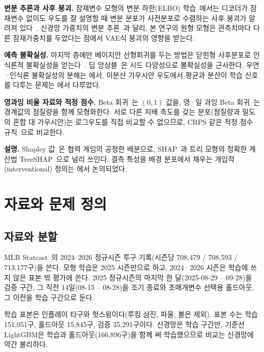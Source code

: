 \documentclass[journal,a4paper,10pt]{IEEEtran}
\begin{document}
\textbf{변분 추론과 사후 붕괴.} 잠재변수 모형의 변분 하한(ELBO) 학습~\cite{kingma2014vae}에서는 디코더가 잠재변수 없이도 우도를 잘 설명할 때 변분 분포가 사전분포로 수렴하는 사후 붕괴가 알려져 있다~\cite{bowman2016generating}. 신경망 가중치의 변분 추론~\cite{blundell2015weight}과 달리, 본 연구의 원형 모형은 관측치마다 다른 잠재가중치를 두었다는 점에서 VAE식 붕괴의 영향을 받는다.

\textbf{예측 불확실성.} 마지막 층에만 베이지안 선형회귀를 두는 방법은 닫힌형 사후분포로 인식론적 불확실성을 얻는다~\cite{snoek2015scalable,bishop2006pattern}. 딥 앙상블~\cite{lakshminarayanan2017simple}은 시드 다양성으로 불확실성을 근사한다. 우연·인식론 불확실성의 분해는 \cite{kendall2017uncertainties}에서, 이분산 가우시안 우도에서 평균과 분산이 학습 신호를 다투는 문제는 \cite{seitzer2022pitfalls}에서 다루었다.

\textbf{영과잉 비율 자료와 적정 점수.} Beta 회귀~\cite{ferrari2004beta}는 $(0,1)$ 값을, 영·일 과잉 Beta 회귀~\cite{ospina2012general}는 경계값의 점질량을 함께 모형화한다. 서로 다른 지배 측도를 갖는 분포(점질량과 밀도의 혼합 대 가우시안)는 로그우도를 직접 비교할 수 없으므로, CRPS 같은 적정 점수 규칙~\cite{gneiting2007strictly}으로 비교한다.

\textbf{설명.} Shapley 값~\cite{shapley1953value}은 협력 게임의 공정한 배분으로, SHAP~\cite{lundberg2017unified}과 트리 모형의 정확한 계산법 TreeSHAP~\cite{lundberg2020local}으로 널리 쓰인다. 결측 특성을 배경 분포에서 채우는 개입적(interventional) 정의는 \cite{janzing2020feature}에서 논의되었다.

\section{자료와 문제 정의}
\label{sec:data}

\subsection{자료와 분할}
MLB Statcast~\cite{savant}의 2024–2026 정규시즌 투구 기록(시즌당 708,479 / 708,593 / 713,177구)을 쓴다. 모형 학습은 2025 시즌만으로 하고, 2024·2026 시즌은 학습에 쓰지 않은 표본 밖 평가에 쓴다. 2025 정규시즌의 마지막 한 달(2025-08-29 – 09-28)을 검증 구간, 그 직전 14일(08-15 – 08-28)을 조기 종료와 초매개변수 선택용 홀드아웃, 그 이전을 학습 구간으로 둔다.

학습 표본은 인플레이 타구와 헛스윙이다(루킹 삼진, 파울, 볼은 제외). 표본 수는 학습 151,051구, 홀드아웃 15,845구, 검증 35,291구이다. 신경망은 학습 구간만, 기준선 LightGBM은 학습과 홀드아웃(166,896구)을 함께 써 학습했으므로 비교는 신경망에 약간 불리하다.
\end{document}
